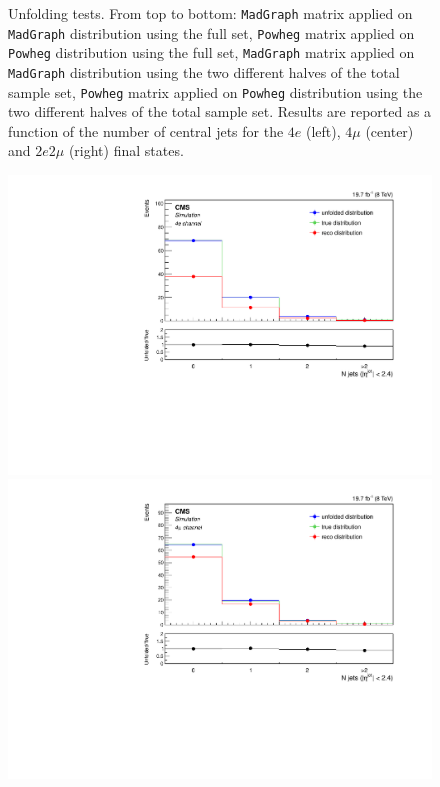 \begin{figure}[hbtp]
\begin{center}
      \caption{Unfolding tests. From top to bottom: \texttt{MadGraph} matrix applied on \texttt{MadGraph} distribution using the full set, \texttt{Powheg} matrix applied on \texttt{Powheg} distribution using the full set,  \texttt{MadGraph} matrix applied on \texttt{MadGraph} distribution using the two different halves of the total sample set, \texttt{Powheg} matrix applied on \texttt{Powheg} distribution using the two different halves of the total sample set. Results are reported as a function of the number of central jets for the $4e$ (left), $4\mu$ (center) and $2e2\mu$ (right) final states.}
    \label{fig:MCtest_CentralJets1}
  \end{center}
\end{figure}

\begin{figure}[hbtp]
  \begin{center}
    \includegraphics[width=0.8\cmsFigWidth]{Figures/Unfolding/MCTests/CentralJets_ZZTo4e_MadMatrix_PowDistr_FullSample_fr}     
    \includegraphics[width=0.8\cmsFigWidth]{Figures/Unfolding/MCTests/CentralJets_ZZTo4m_MadMatrix_PowDistr_FullSample_fr}     

\end{center}
\end{figure}
